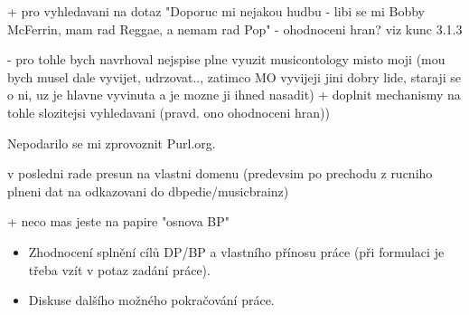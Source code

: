 + pro vyhledavani na dotaz "Doporuc mi nejakou hudbu - libi se mi Bobby McFerrin, mam rad Reggae, a nemam rad Pop" - ohodnoceni hran? viz kunc 3.1.3

      - pro tohle bych navrhoval nejspise plne vyuzit musicontology misto moji (mou bych musel dale vyvijet, udrzovat.., zatimco MO vyvijeji jini dobry lide, staraji se o ni, uz je hlavne vyvinuta a je mozne ji ihned nasadit) + doplnit mechanismy na tohle slozitejsi vyhledavani (pravd. ono ohodnoceni hran))
      
      Nepodarilo se mi zprovoznit Purl.org.
      
      v posledni rade presun na vlastni domenu (predevsim po prechodu z rucniho plneni dat na odkazovani do dbpedie/musicbrainz)
      
      
      
      + neco mas jeste na papire "osnova BP"
      
\begin{itemize}
\item Zhodnocení splnění cílů DP/BP a  vlastního přínosu práce (při formulaci je třeba vzít v potaz zadání práce).
\item Diskuse dalšího možného pokračování práce.
\end{itemize} 